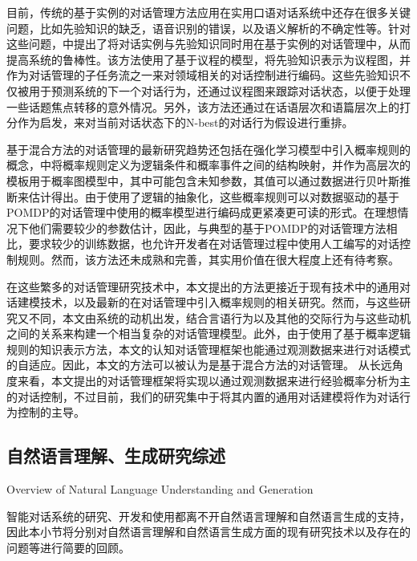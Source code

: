 \begin{enumerate}
目前，传统的基于实例的对话管理方法应用在实用口语对话系统中还存在很多关键问题，比如先验知识的缺乏，语音识别的错误，以及语义解析的不确定性等。针对这些问题，\cite{Lee2009b}中提出了将对话实例与先验知识同时用在基于实例的对话管理中，从而提高系统的鲁棒性。该方法使用了基于议程的模型，将先验知识表示为议程图，并作为对话管理的子任务流之一来对领域相关的对话控制进行编码。这些先验知识不仅被用于预测系统的下一个对话行为，还通过议程图来跟踪对话状态，以便于处理一些话题焦点转移的意外情况。另外，该方法还通过在话语层次和语篇层次上的打分作为启发，来对当前对话状态下的N-best的对话行为假设进行重排。

基于混合方法的对话管理的最新研究趋势还包括在强化学习模型中引入概率规则的概念，\cite{Lison2015}中将概率规则定义为逻辑条件和概率事件之间的结构映射，并作为高层次的模板用于概率图模型中，其中可能包含未知参数，其值可以通过数据进行贝叶斯推断来估计得出。由于使用了逻辑的抽象化，这些概率规则可以对数据驱动的基于POMDP的对话管理中使用的概率模型进行编码成更紧凑更可读的形式。在理想情况下他们需要较少的参数估计，因此，与典型的基于POMDP的对话管理方法相比，要求较少的训练数据，也允许开发者在对话管理过程中使用人工编写的对话控制规则。然而，该方法还未成熟和完善，其实用价值在很大程度上还有待考察。

\end{enumerate}

在这些繁多的对话管理研究技术中，本文提出的方法更接近于现有技术中的通用对话建模技术，以及最新的在对话管理中引入概率规则的相关研究。然而，与这些研究又不同，本文由系统的动机出发，结合言语行为以及其他的交际行为与这些动机之间的关系来构建一个相当复杂的对话管理模型。此外，由于使用了基于概率逻辑规则的知识表示方法，本文的认知对话管理框架也能通过观测数据来进行对话模式的自适应。因此，本文的方法可以被认为是基于混合方法的对话管理。
从长远角度来看，本文提出的对话管理框架将实现以通过观测数据来进行经验概率分析为主的对话控制，不过目前，我们的研究集中于将其内置的通用对话建模将作为对话行为控制的主导。


\subsection{自然语言理解、生成研究综述}{Overview of Natural Language Understanding and Generation}

智能对话系统的研究、开发和使用都离不开自然语言理解和自然语言生成的支持，因此本小节将分别对自然语言理解和自然语言生成方面的现有研究技术以及存在的问题等进行简要的回顾。

